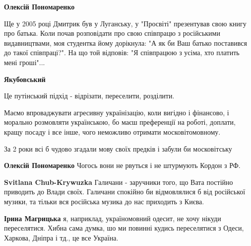 \begin{itemize}
\begin{itemize}
\textbf{Олексій Пономаренко} 

Ще у 2005 році Дмитрик був у Луганську, у "Просвіті" презентував свою книгу про
батька. Коли почав розповідати про свою співпрацю з російськими видавництвами,
моя студентка йому дорікнула: "А як би Ваш батько поставився до такої
співпраці?". На що той відповів: "Я співпрацюю з усіма, хто платить мені
гроші"...

 
\textbf{Якубовський}

Це путінський підхід - відрізати, переселити, розділити.

Маємо впроваджувати агресивну українізацію, коли вигідно і фінансово, і
морально розмовляти українською, бо маєш преференції на роботі, доплати, кращу
посаду і все інше, чого неможливо отримати московітомовному.

За 2 роки всі б чудово згадали мову своїх предків і забули би московітську


 
\textbf{Олексій Пономаренко} Чогось вони не рвуться і не штурмують Кордон з РФ.

 
\textbf{Svitlana Chub-Krywuzka} Галичани - заручники того, що Вата постійно приводить до Влади своїх. Галичани спокійно би відмовлялися б від російської музики, та тільки вся російська музика до нас приходить з Києва.

 
\textbf{Ірина Магрицька} я, наприклад, україномовний одесит, не хочу нікуди переселятися. Хибна сама думка, шо ми повинні кудись переселятися з Одеси, Харкова, Дніпра і тд., це все Україна.


\end{itemize}
\end{itemize}
